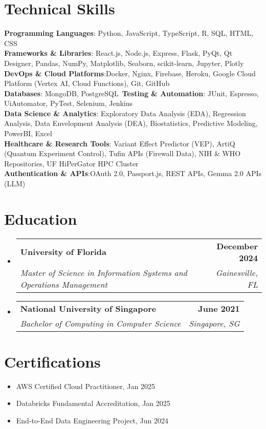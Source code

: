\documentclass[letterpaper,11pt]{article}
\makeatletter
\newcommand{\resumeItem}[1]{
  \item\small{
    {#1 \vspace{-2pt}}
  }
}
\newcommand{\resumeSubheading}[4]{
  \vspace{-2pt}\item
    \begin{tabular*}{1.0\textwidth}[t]{l@{\extracolsep{\fill}}r}
      \textbf{#1} & \textbf{\small #2} \\
      \textit{\small#3} & \textit{\small #4} \\
    \end{tabular*}
}
\newcommand{\resumeSubHeadingListStart}{\begin{itemize}[leftmargin=0.0in, label={}]}
\newcommand{\resumeSubHeadingListEnd}{\end{itemize}}
\newcommand{\resumeItemListStart}{\begin{itemize}}
\newcommand{\resumeItemListEnd}{\end{itemize}}
\makeatother
\begin{document}
\section{Technical Skills}
\begin{itemize}[leftmargin=0.15in, label={}]
    \small{\item{
    \textbf{Programming Languages}{: Python, JavaScript, TypeScript, R, SQL, HTML, CSS} \\
    \textbf{Frameworks \& Libraries}{: React.js, Node.js, Express, Flask, PyQt, Qt Designer, Pandas, NumPy, Matplotlib, Seaborn, scikit-learn, Jupyter, Plotly} \\
    \textbf{DevOps \& Cloud Platforms}{:Docker, Nginx, Firebase, Heroku, Google Cloud Platform (Vertex AI, Cloud Functions), Git, GitHub}\\
    \textbf{Databases}{: MongoDB, PostgreSQL}\
    \textbf{Testing \& Automation}{: JUnit, Espresso, UiAutomator, PyTest, Selenium, Jenkins}\\
    \textbf{Data Science \& Analytics}{: Exploratory Data Analysis (EDA), Regression Analysis, Data Envelopment Analysis (DEA), Biostatistics, Predictive Modeling, PowerBI, Excel}\\
    \textbf{Healthcare \& Research Tools}{: Variant Effect Predictor (VEP), ArtiQ (Quantum Experiment Control), Tufin APIs (Firewall Data), NIH \& WHO Repositories, UF HiPerGator HPC Cluster}\\
    \textbf{Authentication \& APIs}{:OAuth 2.0, Passport.js, REST APIs, Gemma 2.0 APIs (LLM)} \\
    }}
\end{itemize}

\section{Education}
  \resumeSubHeadingListStart
    \resumeSubheading
      {University of Florida}{December 2024}
      {Master of Science in Information Systems and Operations Management}{Gainesville, FL}
    \resumeSubheading
      {National University of Singapore}{June 2021}
      {Bachelor of Computing in Computer Science}{Singapore, SG}
  \resumeSubHeadingListEnd
  
%

\section{Certifications}
   \resumeItemListStart
    \resumeItem{AWS Certified Cloud Practitioner, Jan 2025}
    \resumeItem{Databricks Fundamental Accreditation, Jan 2025}
    \resumeItem{End-to-End Data Engineering Project, Jun 2024}
   \resumeItemListEnd
\end{document}
